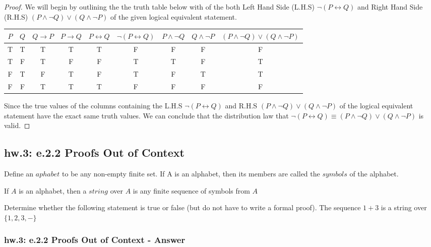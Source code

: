 \begin{proof}
We will begin by outlining the the truth table below with of the both Left Hand Side (L.H.S) $\neg (P \longleftrightarrow Q)$ and Right Hand Side (R.H.S) $(P \wedge \neg Q) \vee (Q \wedge \neg P)$ of the given logical equivalent statement. \\

\begin{center}
\begin{tabular}{|c|c|c|c|c|c|c|c|c|}
\hline 
$P$ & $Q$ & $Q \to P$ & $P \to Q$ & $P \longleftrightarrow Q$ & $\neg(P \longleftrightarrow Q)$ & $P \wedge \neg Q$ & $Q \wedge \neg P$ & $(P \wedge \neg Q) \vee (Q \wedge \neg P)$ \\ 
\hline 
T & T & T & T & T & F & F & F & F \\ 
\hline
T & F & T & F & F & T & T & F & T \\ 
\hline 
F & T & F & T & F & T & F & T & T \\ 
\hline 
F & F & T & T & T & F & F & F & F \\ 
\hline 
\end{tabular} 
\end{center}

Since the true values of the columns containing the L.H.S $\neg (P \longleftrightarrow Q)$ and R.H.S $(P \wedge \neg Q) \vee (Q \wedge \neg P)$ of the logical equivalent statement have the exact same truth values. We can conclude that the distribution law that $\neg (P \longleftrightarrow Q) \equiv (P \wedge \neg Q) \vee (Q \wedge \neg P)$ is valid. 
\end{proof}


\newpage
\subsection{hw.3: e.2.2 Proofs Out of Context}
Define an $aphabet$ to be any non-empty finite set. If A is an alphabet, then its members are called the $symbols$ of the alphabet.

If $A$ is an alphabet, then a $string$ over $A$ is any finite sequence of symbols from $A$

Determine whether the following statement is true or false (but do not have to write a formal proof). The sequence $1+3$ is a string over $\{ 1,2,3, - \}$


\subsubsection*{hw.3: e.2.2 Proofs Out of Context - Answer}

